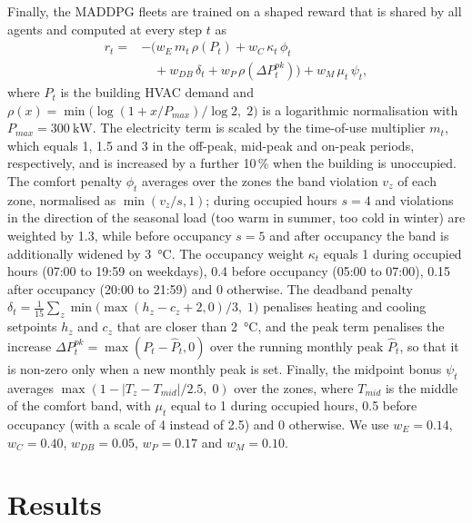 \documentclass[conference]{IEEEtran}
\begin{document}
Finally, the MADDPG fleets are trained on a shaped reward that is shared by
all agents and computed at every step $t$ as
\begin{equation}
\begin{aligned}
r_t = {} & -\Big( w_E\, m_t\, \rho(P_t) + w_C\, \kappa_t\, \phi_t \\
        & \quad + w_{DB}\, \delta_t + w_P\, \rho(\Delta P^{pk}_t) \Big)
          + w_M\, \mu_t\, \psi_t ,
\end{aligned}
\label{eq:reward}
\end{equation}
where $P_t$ is the building HVAC demand and
$\rho(x) = \min\!\big(\log(1 + x/P_{max}) / \log 2,\; 2\big)$ is a logarithmic
normalisation with $P_{max} = \SI{300}{\kilo\watt}$. The electricity term is
scaled by the time-of-use multiplier $m_t$, which equals 1, 1.5 and 3 in the
off-peak, mid-peak and on-peak periods, respectively, and is increased by a
further 10\,\% when the building is unoccupied. The comfort penalty $\phi_t$
averages over the zones the band violation $v_z$ of each zone, normalised as
$\min(v_z/s, 1)$; during occupied hours $s = 4$ and violations in the
direction of the seasonal load (too warm in summer, too cold in winter) are
weighted by 1.3, while before occupancy $s = 5$ and after occupancy the band
is additionally widened by \SI{3}{\celsius}. The occupancy weight $\kappa_t$
equals 1 during occupied hours (07:00 to 19:59 on weekdays), 0.4 before
occupancy (05:00 to 07:00), 0.15 after occupancy (20:00 to 21:59) and 0
otherwise. The deadband penalty
$\delta_t = \frac{1}{15}\sum_z \min\!\big(\max(h_z - c_z + 2, 0)/3,\; 1\big)$
penalises heating and cooling setpoints $h_z$ and $c_z$ that are closer than
\SI{2}{\celsius}, and the peak term penalises the increase
$\Delta P^{pk}_t = \max(P_t - \hat{P}_t, 0)$ over the running monthly peak
$\hat{P}_t$, so that it is non-zero only when a new monthly peak is set.
Finally, the midpoint bonus $\psi_t$ averages
$\max(1 - |T_z - T_{mid}|/2.5,\; 0)$ over the zones, where $T_{mid}$ is the
middle of the comfort band, with $\mu_t$ equal to 1 during occupied hours, 0.5
before occupancy (with a scale of 4 instead of 2.5) and 0 otherwise. We use
$w_E = 0.14$, $w_C = 0.40$, $w_{DB} = 0.05$, $w_P = 0.17$ and $w_M = 0.10$.

\section{Results}
\label{sec:results}
\end{document}
